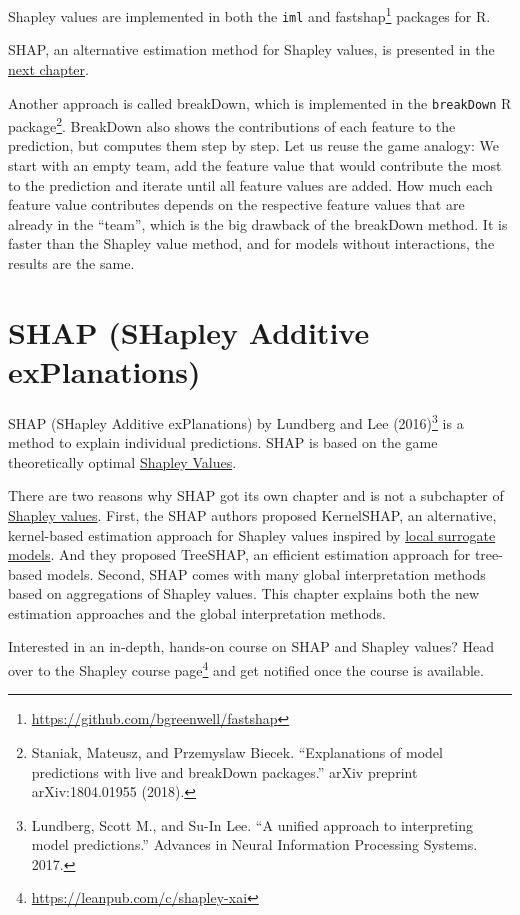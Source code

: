 \documentclass[12pt,]{krantz}
\newenvironment{rmdnote}{}{}
\renewcommand{\href}[2]{#2\footnote{\url{#1}}}
\begin{document}
Shapley values are implemented in both the \texttt{iml} and
\href{https://github.com/bgreenwell/fastshap}{fastshap} packages for R.

SHAP, an alternative estimation method for Shapley values, is presented
in the \protect\hyperlink{shap}{next chapter}.

Another approach is called breakDown, which is implemented in the
\texttt{breakDown} R package\footnote{Staniak, Mateusz, and Przemyslaw
  Biecek. ``Explanations of model predictions with live and breakDown
  packages.'' arXiv preprint arXiv:1804.01955 (2018).}. BreakDown also
shows the contributions of each feature to the prediction, but computes
them step by step. Let us reuse the game analogy: We start with an empty
team, add the feature value that would contribute the most to the
prediction and iterate until all feature values are added. How much each
feature value contributes depends on the respective feature values that
are already in the ``team'', which is the big drawback of the breakDown
method. It is faster than the Shapley value method, and for models
without interactions, the results are the same.

\newpage

\hypertarget{shap}{\section{SHAP (SHapley Additive
exPlanations)}\label{shap}}

SHAP (SHapley Additive exPlanations) by Lundberg and Lee
(2016)\footnote{Lundberg, Scott M., and Su-In Lee. ``A unified approach
  to interpreting model predictions.'' Advances in Neural Information
  Processing Systems. 2017.} is a method to explain individual
predictions. SHAP is based on the game theoretically optimal
\protect\hyperlink{shapley}{Shapley Values}.

There are two reasons why SHAP got its own chapter and is not a
subchapter of \protect\hyperlink{shapley}{Shapley values}. First, the
SHAP authors proposed KernelSHAP, an alternative, kernel-based
estimation approach for Shapley values inspired by
\protect\hyperlink{lime}{local surrogate models}. And they proposed
TreeSHAP, an efficient estimation approach for tree-based models.
Second, SHAP comes with many global interpretation methods based on
aggregations of Shapley values. This chapter explains both the new
estimation approaches and the global interpretation methods.

\begin{rmdnote} Interested in an in-depth, hands-on course on
SHAP and Shapley values? Head over to
\href{https://leanpub.com/c/shapley-xai}{the Shapley course page} and
get notified once the course is available. \end{rmdnote}
\end{document}
